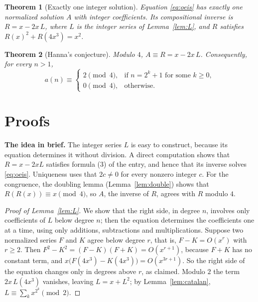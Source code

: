 \documentclass[11pt,a4paper]{article}
\newtheorem{theorem}{Theorem}[section]
\theoremstyle{definition}
\theoremstyle{remark}
\newcommand{\para}[1]{\par\medskip\noindent\textbf{#1}\enspace}
\begin{document}
\begin{theorem}[Exactly one integer solution]\label{thm:exist}
Equation \eqref{eq:oeis} has exactly one normalized solution $A$ with integer coefficients. Its compositional inverse is
$R=x-2x\,L$, where $L$ is the integer series of Lemma~\ref{lem:L}, and $R$ satisfies $R(x)^2+R(4x^3)=x^2$.
\end{theorem}

\begin{theorem}[Hanna's conjecture]\label{thm:main}
Modulo $4$, $A\equiv R=x-2x\,L$. Consequently, for every $n>1$,
\[
a(n)\equiv\begin{cases}2\pmod4,&\text{if }n=2^k+1\text{ for some }k\ge0,\\[2pt]0\pmod4,&\text{otherwise.}\end{cases}
\]
\end{theorem}

\section{Proofs}\label{sec:proofs}

\para{The idea in brief.} The integer series $L$ is easy to construct, because its equation determines it without
division. A direct computation shows that $R=x-2xL$ satisfies formula (3) of the entry, and hence that its inverse solves
\eqref{eq:oeis}. Uniqueness uses that $2c\ne0$ for every nonzero integer $c$. For the congruence, the doubling lemma
(Lemma~\ref{lem:double}) shows that $R(R(x))\equiv x\pmod 4$, so $A$, the inverse of $R$, agrees with $R$ modulo $4$.

\begin{proof}[Proof of Lemma~\ref{lem:L}]
We show that the right side, in degree $n$, involves only coefficients of $L$ below degree $n$; then the equation
determines the coefficients one at a time, using only additions, subtractions and multiplications. Suppose two normalized
series $F$ and $K$ agree below degree $r$, that is, $F-K=O(x^r)$ with $r\ge2$. Then $F^2-K^2=(F-K)(F+K)=O(x^{r+1})$,
because $F+K$ has no constant term, and $x\bigl(F(4x^3)-K(4x^3)\bigr)=O(x^{3r+1})$. So the right side of the equation
changes only in degrees above $r$, as claimed. Modulo $2$ the term $2x\,L(4x^3)$ vanishes, leaving $L=x+L^2$; by
Lemma~\ref{lem:catalan}, $L\equiv\sum_kx^{2^k}\pmod 2$.
\end{proof}
\end{document}

